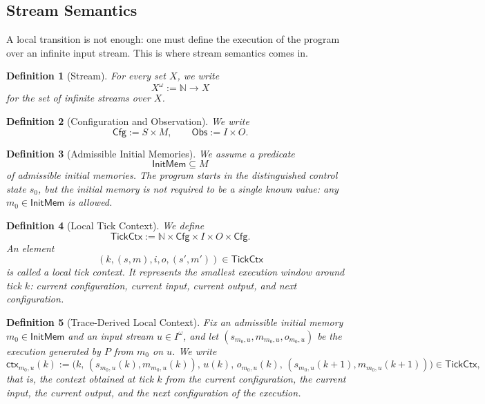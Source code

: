 \documentclass[11pt,a4paper]{article}
\newtheorem{definition}{Definition}[section]
\newcommand{\Nat}{\mathbb{N}}
\newcommand{\Stream}[1]{#1^\omega}
\newcommand{\Cfg}{\mathsf{Cfg}}
\newcommand{\Obs}{\mathsf{Obs}}
\newcommand{\TickCtx}{\mathsf{TickCtx}}
\newcommand{\ctx}{\mathsf{ctx}}
\begin{document}
\subsection{Stream Semantics}

A local transition is not enough: one must define the execution of the program
over an infinite input stream. This is where stream semantics comes in.

\begin{definition}[Stream]
For every set \(X\), we write
\[
\Stream{X} := \Nat \to X
\]
for the set of infinite streams over \(X\).
\end{definition}

\begin{definition}[Configuration and Observation]
We write
\[
\Cfg := S \times M,
\qquad
\Obs := I \times O.
\]
\end{definition}

\begin{definition}[Admissible Initial Memories]
We assume a predicate
\[
\mathsf{InitMem} \subseteq M
\]
of admissible initial memories. The program starts in the distinguished control
state \(s_0\), but the initial memory is not required to be a single known
value: any \(m_0 \in \mathsf{InitMem}\) is allowed.
\end{definition}

\begin{definition}[Local Tick Context]
We define
\[
\TickCtx := \Nat \times \Cfg \times I \times O \times \Cfg.
\]
An element
\[
(k,(s,m),i,o,(s',m')) \in \TickCtx
\]
is called a \emph{local tick context}. It represents the smallest execution
window around tick \(k\): current configuration, current input, current output,
and next configuration.
\end{definition}

\begin{definition}[Trace-Derived Local Context]
Fix an admissible initial memory \(m_0 \in \mathsf{InitMem}\) and an input stream
\(u \in \Stream{I}\), and let \((s_{m_0,u},m_{m_0,u},o_{m_0,u})\) be the
execution generated by \(P\) from \(m_0\) on \(u\). We write
\[
\ctx_{m_0,u}(k) :=
\bigl(k,\,(s_{m_0,u}(k),m_{m_0,u}(k)),\,u(k),\,o_{m_0,u}(k),\,
      (s_{m_0,u}(k+1),m_{m_0,u}(k+1))\bigr)
\in \TickCtx,
\]
that is, the context obtained at tick \(k\) from the current configuration, the
current input, the current output, and the next configuration of the execution.
\end{definition}
\end{document}
